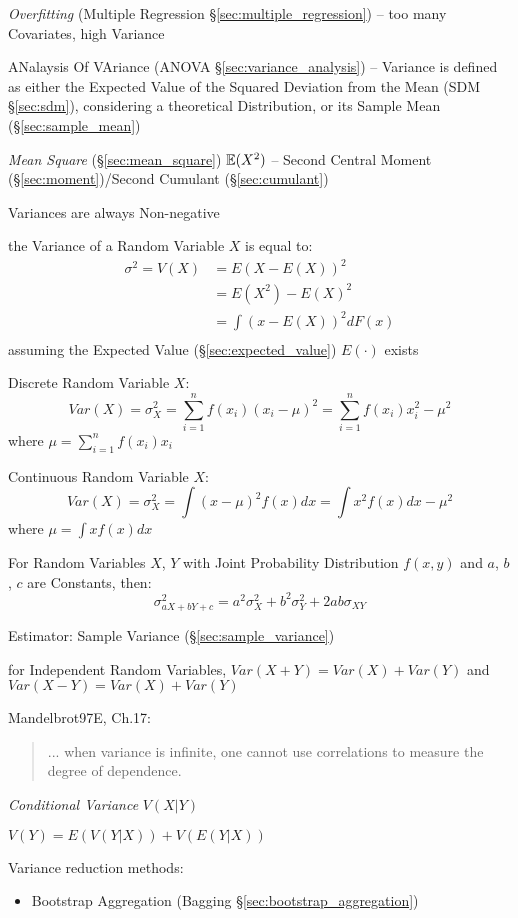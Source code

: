\emph{Overfitting} (Multiple Regression \S\ref{sec:multiple_regression}) -- too
many Covariates, high Variance

\fist ANalaysis Of VAriance (ANOVA \S\ref{sec:variance_analysis}) --
Variance is defined as either the Expected Value of the
Squared Deviation from the Mean (SDM \S\ref{sec:sdm}), considering a theoretical
Distribution, or its Sample Mean (\S\ref{sec:sample_mean})

\emph{Mean Square} (\S\ref{sec:mean_square}) $\mathbb{E}(X^2)$ -- Second Central
Moment (\S\ref{sec:moment})/Second Cumulant (\S\ref{sec:cumulant})

Variances are always Non-negative

the Variance of a Random Variable $X$ is equal to:
\begin{align*}
  \sigma^2 = V(X) & = E(X - E(X))^2   \\
                  & = E(X^2) - E(X)^2 \\
                  & = \int(x - E(X))^2 dF(x) \\
\end{align*}
assuming the Expected Value (\S\ref{sec:expected_value}) $E(\cdot)$ exists

Discrete Random Variable $X$:
\[
  Var(X) = \sigma_X^2 = \sum_{i=1}^n f(x_i) (x_i - \mu)^2 = \sum_{i=1}^n
  f(x_i) x_i^2 - \mu^2
\]
where $\mu = \sum_{i=1}^n f(x_i) x_i$

Continuous Random Variable $X$:
\[
  Var(X) = \sigma_X^2 = \int (x - \mu)^2 f(x) dx = \int x^2 f(x) dx -
  \mu^2
\]
where $\mu = \int x f(x) dx$

For Random Variables $X$, $Y$ with Joint Probability Distribution
$f(x,y)$ and $a$, $b$, $c$ are Constants, then:
\[
  \sigma^2_{a X + b Y + c} = a^2 \sigma^2_X + b^2 \sigma^2_Y + 2ab
  \sigma_{X Y}
\]

\fist Estimator: Sample Variance (\S\ref{sec:sample_variance})

for Independent Random Variables, $Var(X + Y) = Var(X) + Var(Y)$ and
$Var(X - Y) = Var(X) + Var(Y)$

Mandelbrot97E, Ch.17:
\begin{quote}
  ... when variance is infinite, one cannot use correlations to measure the
  degree of dependence.
\end{quote}

\emph{Conditional Variance} $V(X|Y)$

$V(Y) = E(V(Y|X)) + V(E(Y|X))$

Variance reduction methods:
\begin{itemize}
  \item Bootstrap Aggregation (Bagging \S\ref{sec:bootstrap_aggregation})
\end{itemize}



